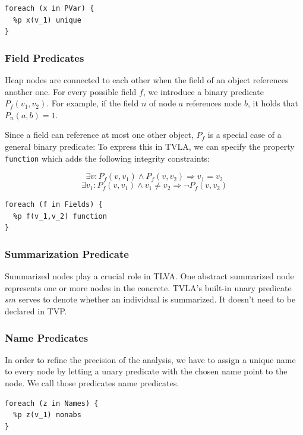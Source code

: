 \documentclass[11pt,a4paper,english]{article}
\begin{document}
\begin{lstlisting}[language=tvp,caption={Declaration of Program Variable Predicates},label=lst:tvpprogramvars]
%s PVar {x,y,z,..}
foreach (x in PVar) { 
  %p x(v_1) unique 
}
\end{lstlisting}


\subsubsection{Field Predicates}
Heap nodes are connected to each other when the field of an object references
another one. For every possible field $f$, we introduce a binary predicate
$P_f(v_1,v_2)$. For example, if the field $n$ of node $a$ references node $b$,
it holds that $P_n(a,b) = 1$.

Since a field can reference at most one other object, $P_f$ is a special case of
a general binary predicate: To express this in TVLA, we can specify the property
\texttt{function} which adds the following integrity constraints:

\[ 
  \exists v: P_f(v,v_1) \wedge P_f(v,v_2) \Rightarrow v_1 = v_2  
\]
\[
  \exists v_1: P_f(v,v_1) \wedge v_1 \neq v_2 \Rightarrow \lnot P_f(v,v_2) 
\]

\begin{lstlisting}[language=tvp,caption={Declaration of Field Predicates},label=lst:tvpfields]
%s Fields {n, i, ...} // all field names
foreach (f in Fields) {
  %p f(v_1,v_2) function
}
\end{lstlisting}


\subsubsection{Summarization Predicate}
Summarized nodes play a crucial role in TLVA. One abstract summarized node
represents one or more nodes in the concrete. TVLA's built-in unary predicate
$sm$ serves to denote whether an individual is summarized. It doesn't need to be
declared in TVP.


\subsubsection{Name Predicates} 
In order to refine the precision of the analysis, we have to assign a
unique name to every node by letting a unary predicate with the chosen
name point to the node. We call those predicates name predicates.

\begin{lstlisting}[language=tvp,caption={Declaration of Name Predicates},label=lst:tvpnames]
%s Names { n1, n2, ...}
foreach (z in Names) { 
  %p z(v_1) nonabs
}
\end{lstlisting}
\end{document}
